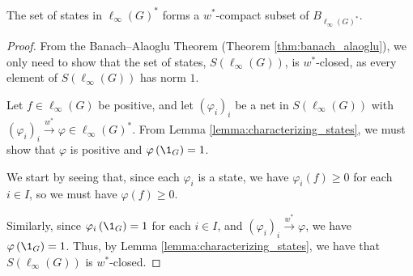 \documentclass[10pt]{mypackage2}
\begin{document}
\begin{corollary}
  The set of states in $\ell_{\infty}\left(G\right)^{\ast}$ forms a $w^{\ast}$-compact subset of $B_{\ell_{\infty}\left(G\right)^{\ast}}$.
\end{corollary}
\begin{proof}
  From the Banach--Alaoglu Theorem (Theorem \ref{thm:banach_alaoglu}), we only need to show that the set of states, $S\left(\ell_{\infty}\left(G\right)\right)$, is $w^{\ast}$-closed, as every element of $S\left(\ell_{\infty}\left(G\right)\right)$ has norm $1$.\newline

  Let $f\in \ell_{\infty}\left(G\right)$ be positive, and let $\left(\varphi_{i}\right)_i$ be a net in $S\left(\ell_{\infty}\left(G\right)\right)$ with $\left(\varphi_{i}\right)_i\xrightarrow{w^{\ast}} \varphi\in \ell_{\infty}\left(G\right)^{\ast}$. From Lemma \ref{lemma:characterizing_states}, we must show that $\varphi$ is positive and $\varphi\left(\1_{G}\right) = 1$.\newline

  We start by seeing that, since each $\varphi_i$ is a state, we have $\varphi_{i}\left(f\right) \geq 0$ for each $i\in I$, so we must have $\varphi\left(f\right) \geq 0$.\newline

  Similarly, since $\varphi_{i}\left(\1_{G}\right) = 1$ for each $i\in I$, and $\left(\varphi_i\right)_i \xrightarrow{w^{\ast}} \varphi$, we have $\varphi\left(\1_{G}\right) = 1$. Thus, by Lemma \ref{lemma:characterizing_states}, we have that $S\left(\ell_{\infty}\left(G\right)\right)$ is $w^{\ast}$-closed.
\end{proof}
\end{document}
